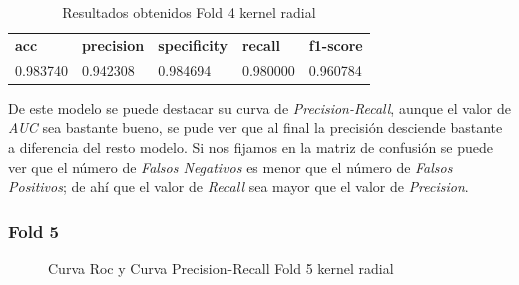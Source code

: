 \begin{table}[H]
	\centering
	\begin{tabular}{lllll}
		\textbf{acc} & \textbf{precision} & \textbf{specificity} & \textbf{recall} & \textbf{f1-score} \\
		0.983740     & 0.942308           & 0.984694             & 0.980000        & 0.960784         \\
	\end{tabular}
	\caption{Resultados obtenidos Fold 4 kernel radial}
	\label{table:4}
\end{table}

De este modelo se puede destacar su curva de \textit{Precision-Recall}, aunque el valor de \textit{AUC} sea bastante bueno, se pude ver que al final la precisión desciende bastante a diferencia del resto modelo. Si nos fijamos en la matriz de confusión se puede ver que el número de \textit{Falsos Negativos} es menor que el número de \textit{Falsos Positivos}; de ahí que el valor de \textit{Recall} sea mayor que el valor de \textit{Precision}.

\subsubsection{Fold 5}

\begin{figure}[H]
	\centering
	\caption{Curva Roc y Curva Precision-Recall Fold 5 kernel radial}
	\label{fig:resultados5}
\end{figure}

